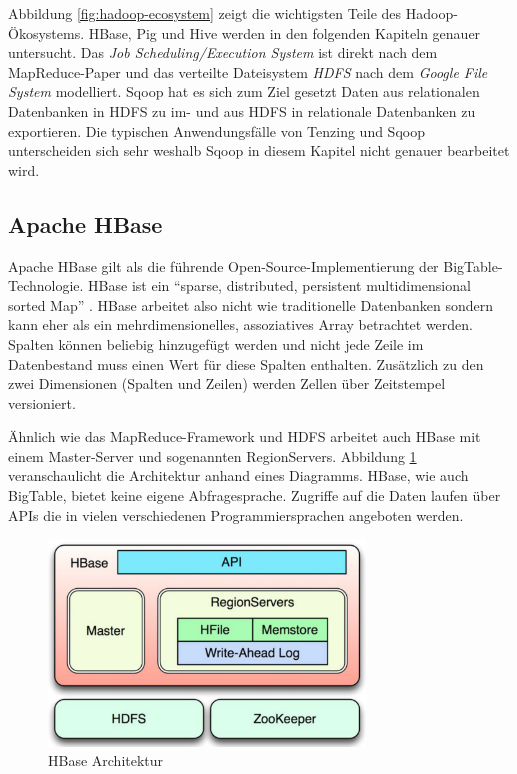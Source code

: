 \documentclass[a4paper]{article}
\begin{document}
Abbildung \ref{fig:hadoop-ecosystem} zeigt die wichtigsten Teile des Hadoop-Ökosystems. HBase, Pig und Hive werden in den folgenden Kapiteln genauer untersucht. Das \textit{Job Scheduling/Execution System} ist direkt nach dem MapReduce-Paper und das verteilte Dateisystem \textit{HDFS} nach dem \textit{Google File System} \cite{GoogleFileSystem:2003} modelliert. Sqoop hat es sich zum Ziel gesetzt Daten aus relationalen Datenbanken in HDFS zu im- und aus HDFS in relationale Datenbanken zu exportieren. Die typischen Anwendungsfälle von Tenzing und Sqoop unterscheiden sich sehr weshalb Sqoop in diesem Kapitel nicht genauer bearbeitet wird.

\subsection{Apache HBase}
Apache HBase \cite{HBase} gilt als die führende Open-Source-Implementierung der BigTable-Technologie\cite{BigTable}. HBase ist ein \enquote{sparse, distributed, persistent multidimensional sorted Map} \cite{JavaMagazin}. HBase arbeitet also nicht wie traditionelle Datenbanken sondern kann eher als ein mehrdimensionelles, assoziatives Array betrachtet werden. Spalten können beliebig hinzugefügt werden und nicht jede Zeile im Datenbestand muss einen Wert für diese Spalten enthalten. Zusätzlich zu den zwei Dimensionen (Spalten und Zeilen) werden Zellen über Zeitstempel versioniert.

Ähnlich wie das MapReduce-Framework und HDFS arbeitet auch HBase mit einem Master-Server und sogenannten RegionServers. Abbildung \ref{fig:hbase} veranschaulicht die Architektur anhand eines Diagramms. HBase, wie auch BigTable, bietet keine eigene Abfragesprache. Zugriffe auf die Daten laufen über APIs die in vielen verschiedenen Programmiersprachen angeboten werden.

\begin{figure}[H]
\centering
\includegraphics[width=0.75\textwidth]{hbase-architecture.png}
\caption{HBase Architektur \cite{docstoc}}
\label{fig:hbase}
\end{figure}
\end{document}
